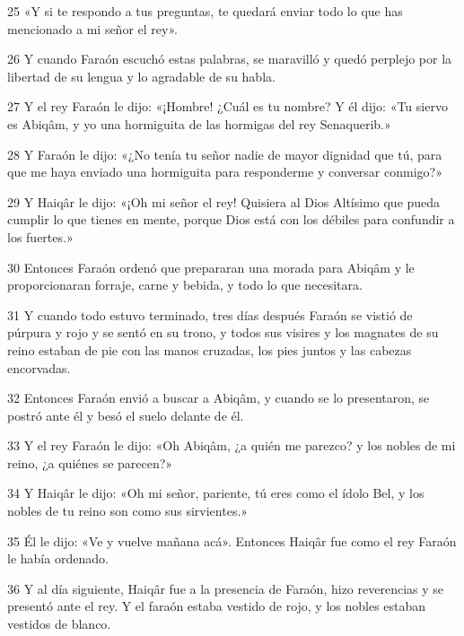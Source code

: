 \par 25 «Y si te respondo a tus preguntas, te quedará enviar todo lo que has mencionado a mi señor el rey».

\par 26 Y cuando Faraón escuchó estas palabras, se maravilló y quedó perplejo por la libertad de su lengua y lo agradable de su habla.

\par 27 Y el rey Faraón le dijo: «¡Hombre! ¿Cuál es tu nombre? Y él dijo: «Tu siervo es Abiqâm, y yo una hormiguita de las hormigas del rey Senaquerib.»

\par 28 Y Faraón le dijo: «¿No tenía tu señor nadie de mayor dignidad que tú, para que me haya enviado una hormiguita para responderme y conversar conmigo?»

\par 29 Y Haiqâr le dijo: «¡Oh mi señor el rey! Quisiera al Dios Altísimo que pueda cumplir lo que tienes en mente, porque Dios está con los débiles para confundir a los fuertes.»

\par 30 Entonces Faraón ordenó que prepararan una morada para Abiqâm y le proporcionaran forraje, carne y bebida, y todo lo que necesitara.

\par 31 Y cuando todo estuvo terminado, tres días después Faraón se vistió de púrpura y rojo y se sentó en su trono, y todos sus visires y los magnates de su reino estaban de pie con las manos cruzadas, los pies juntos y las cabezas encorvadas.

\par 32 Entonces Faraón envió a buscar a Abiqâm, y cuando se lo presentaron, se postró ante él y besó el suelo delante de él.

\par 33 Y el rey Faraón le dijo: «Oh Abiqâm, ¿a quién me parezco? y los nobles de mi reino, ¿a quiénes se parecen?»

\par 34 Y Haiqâr le dijo: «Oh mi señor, pariente, tú eres como el ídolo Bel, y los nobles de tu reino son como sus sirvientes.»

\par 35 Él le dijo: «Ve y vuelve mañana acá». Entonces Haiqâr fue como el rey Faraón le había ordenado.

\par 36 Y al día siguiente, Haiqâr fue a la presencia de Faraón, hizo reverencias y se presentó ante el rey. Y el faraón estaba vestido de rojo, y los nobles estaban vestidos de blanco.


